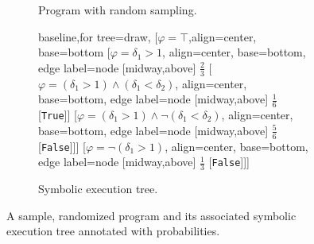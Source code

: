 \documentclass[acmsmall,review,anonymous]{acmart}\settopmatter{printfolios=true,printccs=false,printacmref=false}
\begin{document}
\begin{figure}[h]
	\centering
	\begin{subfigure}{.3\textwidth}
		\centering
		{\small
			\begin{algorithmic}[1]
				\label{line:first_cond}
				\State{}
				\EndIf
				\Else
				\State{}
				\EndIf
			\end{algorithmic}
		}
		\caption{Program with random sampling.}
		\label{fig:exam_program}
	\end{subfigure}
	\begin{subfigure}{.69\textwidth}
		\centering
		{\small
			\begin{forest}baseline,for tree=draw,
				[{$\varphi=\top$},align=center, base=bottom
				[{$\varphi = \delta_1 > 1$}, align=center, base=bottom, edge label={node [midway,above] {$\frac{2}{3}$} }
				[{$\varphi = (\delta_1 > 1) \wedge (\delta_1 < \delta_2)$}, align=center, base=bottom, edge label={node [midway,above] {$\frac{1}{6}$} }
				[{\texttt{True}}]]
				[{$\varphi = (\delta_1 > 1) \wedge \neg(\delta_1 < \delta_2)$}, align=center, base=bottom, edge label={node [midway,above] {$\frac{5}{6}$} }
				[{\texttt{False}}]]]
				[{$\varphi = \neg(\delta_1 > 1)$}, align=center, base=bottom, edge label={node [midway,above] {$\frac{1}{3}$} }
				[{\texttt{False}}]]]
			\end{forest}
		}
		\caption{Symbolic execution tree.}
		\label{fig:exam_tree}
		
	\end{subfigure}
	\caption{A sample, randomized program and its associated symbolic execution tree annotated with probabilities.}
	\label{fig:example}
\end{figure}
\end{document}
